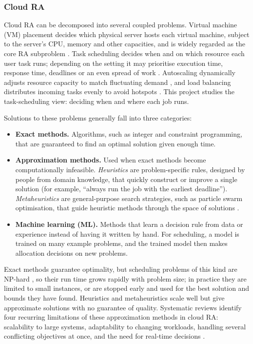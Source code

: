 \documentclass[12pt]{article}
\begin{document}
\subsubsection{Cloud RA}
Cloud RA can be decomposed into several coupled problems. Virtual machine (VM) placement decides which physical server hosts each virtual machine, subject to the server's CPU, memory and other capacities, and is widely regarded as the core RA subproblem \cite{saidi2023}. Task scheduling decides when and on which resource each user task runs; depending on the setting it may prioritise execution time, response time, deadlines or an even spread of work \cite{lbts2024}. Autoscaling dynamically adjusts resource capacity to match fluctuating demand \cite{autoscaling2023}, and load balancing distributes incoming tasks evenly to avoid hotspots \cite{lb2024}. This project studies the task-scheduling view: deciding when and where each job runs.

Solutions to these problems generally fall into three categories:
\begin{itemize}
    \item \textbf{Exact methods.} Algorithms, such as integer and constraint programming, that are guaranteed to find an optimal solution given enough time.
    \item \textbf{Approximation methods.} Used when exact methods become computationally infeasible. \emph{Heuristics} are problem-specific rules, designed by people from domain knowledge, that quickly construct or improve a single solution (for example, ``always run the job with the earliest deadline''). \emph{Metaheuristics} are general-purpose search strategies, such as particle swarm optimisation, that guide heuristic methods through the space of solutions \cite{alkhalifa2025comparative}.
    \item \textbf{Machine learning (ML).} Methods that learn a decision rule from data or experience instead of having it written by hand. For scheduling, a model is trained on many example problems, and the trained model then makes allocation decisions on new problems.
\end{itemize}

Exact methods guarantee optimality, but scheduling problems of this kind are NP-hard \cite{lenstra1977complexity}, so their run time grows rapidly with problem size; in practice they are limited to small instances, or are stopped early and used for the best solution and bounds they have found. Heuristics and metaheuristics scale well but give approximate solutions with no guarantee of quality. Systematic reviews identify four recurring limitations of these approximation methods in cloud RA: scalability to large systems, adaptability to changing workloads, handling several conflicting objectives at once, and the need for real-time decisions \cite{mohamaddiah2014, lbts2024, 10854610, DAHMANI2025100616, ml_ra_litrev2025, hu2021attend2pack}.
\end{document}
